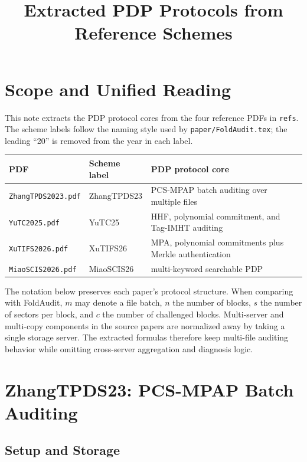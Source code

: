 \documentclass[11pt]{article}
\title{Extracted PDP Protocols from Reference Schemes}
\author{}
\date{}
\begin{document}
\maketitle

\section{Scope and Unified Reading}

This note extracts the PDP protocol cores from the four reference PDFs in
\texttt{refs}.  The scheme labels follow the naming style used by
\texttt{paper/FoldAudit.tex}; the leading ``20'' is removed from the year in
each label.

\begin{center}
\small
\begin{tabular}{p{}p{}p{}}
\toprule
PDF & Scheme label & PDP protocol core \\
\midrule
\texttt{ZhangTPDS2023.pdf} & ZhangTPDS23 & PCS-MPAP batch auditing over multiple files \\
\texttt{YuTC2025.pdf} & YuTC25 & HHF, polynomial commitment, and Tag-IMHT auditing \\
\texttt{XuTIFS2026.pdf} & XuTIFS26 & MPA, polynomial commitments plus Merkle authentication \\
\texttt{MiaoSCIS2026.pdf} & MiaoSCIS26 & multi-keyword searchable PDP \\
\bottomrule
\end{tabular}
\end{center}

The notation below preserves each paper's protocol structure.  When comparing
with FoldAudit, \(m\) may denote a file batch, \(n\) the number of blocks, \(s\)
the number of sectors per block, and \(c\) the number of challenged blocks.
Multi-server and multi-copy components in the source papers are normalized away
by taking a single storage server.  The extracted formulas therefore keep
multi-file auditing behavior while omitting cross-server aggregation and
diagnosis logic.

\section{ZhangTPDS23: PCS-MPAP Batch Auditing}

\subsection{Setup and Storage}
\end{document}
